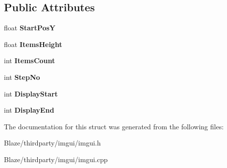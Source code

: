 \subsection*{Public Attributes}
\begin{DoxyCompactItemize}
\item 
\mbox{\label{structImGuiListClipper_affee91b338520cd4bd59b5b680dcb5ae}} 
float {\bfseries Start\+PosY}
\item 
\mbox{\label{structImGuiListClipper_a19762cb78ff0adccb414027c25678a60}} 
float {\bfseries Items\+Height}
\item 
\mbox{\label{structImGuiListClipper_a4e2b4e8efe10615d04ad2aeea467f522}} 
int {\bfseries Items\+Count}
\item 
\mbox{\label{structImGuiListClipper_a8fe78f0368e16425c33fd35ca45d1912}} 
int {\bfseries Step\+No}
\item 
\mbox{\label{structImGuiListClipper_a9d096e06e5633fd77a8a209c00fe454a}} 
int {\bfseries Display\+Start}
\item 
\mbox{\label{structImGuiListClipper_aa49e30d04ad8f8b95fbaa62dfbb4ea3e}} 
int {\bfseries Display\+End}
\end{DoxyCompactItemize}


The documentation for this struct was generated from the following files\+:\begin{DoxyCompactItemize}
\item 
Blaze/thirdparty/imgui/imgui.\+h\item 
Blaze/thirdparty/imgui/imgui.\+cpp\end{DoxyCompactItemize}

